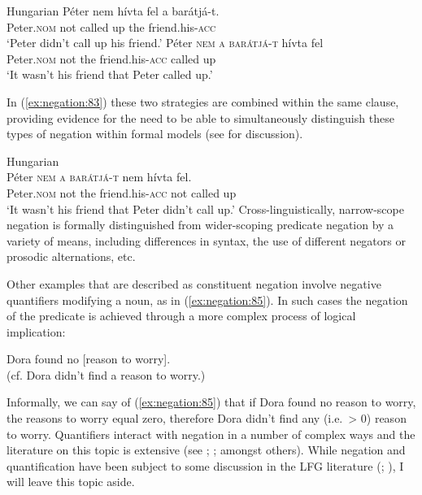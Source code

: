 \documentclass[output=paper,hidelinks]{langscibook}
\begin{document}
\ea\label{ex:negation:51} Hungarian \citep[306--307]{Laczko14}
\ea\label{ex:negation:51a}
\gll Péter nem hívta fel a barátjá-t. \\
  Peter.\textsc{nom} not called up the friend.his-\textsc{acc} \\
\glt‘Peter didn’t call up his friend.’
\ex\label{ex:negation:51b}
\gll Péter \textsc{nem} \textsc{a} \textsc{barátjá-t} hívta fel\\
Peter.\textsc{nom} not the friend.his-\textsc{acc} called up \\
\glt‘It wasn’t his friend that Peter called up.’
\z\z

In (\ref{ex:negation:83}) these two strategies are combined within the same clause, providing evidence for the need to be able to simultaneously distinguish these types of negation within formal models (see  for discussion).
 
 \ea\label{ex:negation:83} Hungarian \citep[306--7]{Laczko14}\\
 \gll Péter \textsc{nem} \textsc{a} \textsc{barátjá-t} nem hívta fel. \\
 Peter.\textsc{nom} not the friend.his-\textsc{acc} not called up \\
 \glt‘It wasn’t his friend that Peter didn’t call up.’ 
 \z
\noindent
Cross-linguistically, narrow-scope negation is formally distinguished from wider-scoping predicate negation by a variety of means, including differences in syntax, the use of different negators or prosodic alternations, etc. 

Other examples that are described as constituent negation involve negative quantifiers modifying a noun, as in (\ref{ex:negation:85}). In such cases the negation of the predicate is achieved through a more complex process of logical implication: 

\ea
\label{ex:negation:85}
Dora found no [reason to worry].\\
(cf. Dora didn't find a reason to worry.)
\z

Informally, we can say of (\ref{ex:negation:85}) that if Dora found no reason to worry, the reasons to worry equal zero, therefore Dora didn't find any (i.e.\ > 0) reason to worry. Quantifiers interact with negation in a number of complex ways and the literature on this topic is extensive (see \citealt {Krifka:95}; \citealt {Swart:09}; \citealt {Penka:10} amongst others). While negation and quantification have been subject to some discussion in the LFG literature (\citealt {Fry:99}; \citealt [291--295; 309--311] {dalrymple01}), I will leave this topic aside.
\end{document}
